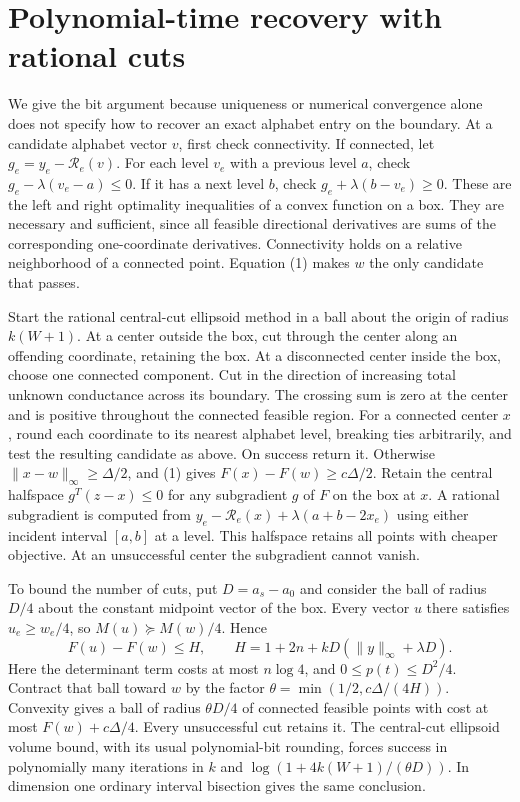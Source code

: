 \documentclass[11pt]{article}
\newcommand{\res}{\mathcal R}
\begin{document}
\section*{Polynomial-time recovery with rational cuts}
We give the bit argument because uniqueness or numerical convergence alone does not specify how to recover an exact alphabet entry on the boundary. At a candidate alphabet vector $v$, first check connectivity. If connected, let $g_e=y_e-\res_e(v)$. For each level $v_e$ with a previous level $a$, check $g_e-\lambda(v_e-a)\le0$. If it has a next level $b$, check $g_e+\lambda(b-v_e)\ge0$. These are the left and right optimality inequalities of a convex function on a box. They are necessary and sufficient, since all feasible directional derivatives are sums of the corresponding one-coordinate derivatives. Connectivity holds on a relative neighborhood of a connected point. Equation (1) makes $w$ the only candidate that passes.

Start the rational central-cut ellipsoid method in a ball about the origin of radius $k(W+1)$. At a center outside the box, cut through the center along an offending coordinate, retaining the box. At a disconnected center inside the box, choose one connected component. Cut in the direction of increasing total unknown conductance across its boundary. The crossing sum is zero at the center and is positive throughout the connected feasible region. For a connected center $x$, round each coordinate to its nearest alphabet level, breaking ties arbitrarily, and test the resulting candidate as above. On success return it. Otherwise $\|x-w\|_\infty\ge\Delta/2$, and (1) gives $F(x)-F(w)\ge c\Delta/2$. Retain the central halfspace $g^T(z-x)\le0$ for any subgradient $g$ of $F$ on the box at $x$. A rational subgradient is computed from $y_e-\res_e(x)+\lambda(a+b-2x_e)$ using either incident interval $[a,b]$ at a level. This halfspace retains all points with cheaper objective. At an unsuccessful center the subgradient cannot vanish.

To bound the number of cuts, put $D=a_s-a_0$ and consider the ball of radius $D/4$ about the constant midpoint vector of the box. Every vector $u$ there satisfies $u_e\ge w_e/4$, so $M(u)\succeq M(w)/4$. Hence
\[
 F(u)-F(w)\le H,\qquad H=1+2n+kD(\|y\|_\infty+\lambda D).
\]
Here the determinant term costs at most $n\log4$, and $0\le p(t)\le D^2/4$. Contract that ball toward $w$ by the factor $\theta=\min(1/2,c\Delta/(4H))$. Convexity gives a ball of radius $\theta D/4$ of connected feasible points with cost at most $F(w)+c\Delta/4$. Every unsuccessful cut retains it. The central-cut ellipsoid volume bound, with its usual polynomial-bit rounding, forces success in polynomially many iterations in $k$ and $\log(1+4k(W+1)/(\theta D))$. In dimension one ordinary interval bisection gives the same conclusion.
\end{document}
